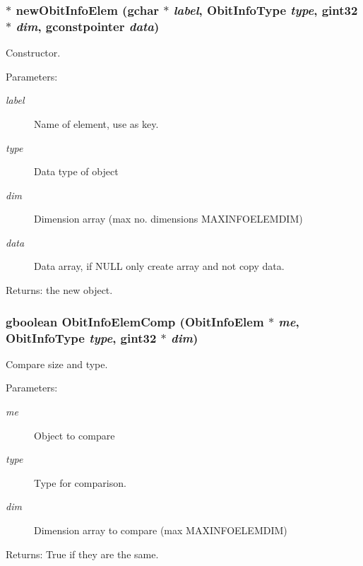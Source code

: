 \subsubsection{$\ast$ new\-Obit\-Info\-Elem (gchar $\ast$ {\em label}, Obit\-Info\-Type {\em type}, gint32 $\ast$ {\em dim}, gconstpointer {\em data})}\label{ObitInfoElem_8c_a0}


Constructor. 

\begin{Desc}
\item[Parameters:]
\begin{description}
\item[{\em label}]Name of element, use as key. \item[{\em type}]Data type of object \item[{\em dim}]Dimension array (max no. dimensions MAXINFOELEMDIM) \item[{\em data}]Data array, if NULL only create array and not copy data. \end{description}
\end{Desc}
\begin{Desc}
\item[Returns:]the new object. \end{Desc}
\subsubsection{\setlength{\rightskip}{0pt plus 5cm}gboolean Obit\-Info\-Elem\-Comp ({\bf Obit\-Info\-Elem} $\ast$ {\em me}, Obit\-Info\-Type {\em type}, gint32 $\ast$ {\em dim})}\label{ObitInfoElem_8c_a4}


Compare size and type. 

\begin{Desc}
\item[Parameters:]
\begin{description}
\item[{\em me}]Object to compare \item[{\em type}]Type for comparison. \item[{\em dim}]Dimension array to compare (max MAXINFOELEMDIM) \end{description}
\end{Desc}
\begin{Desc}
\item[Returns:]True if they are the same. \end{Desc}

